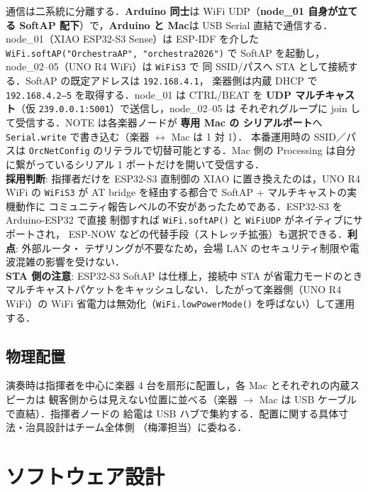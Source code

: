 \documentclass[lualatex,book,paper=a4paper,jafontsize=11.5pt,jafontscale=1.05]{jlreq}
\begin{document}
通信は二系統に分離する．\textbf{Arduino 同士}は WiFi UDP（\textbf{node\_01 自身が立てる
SoftAP 配下}）で，\textbf{Arduino と Mac}は USB Serial 直結で通信する．
node\_01（XIAO ESP32-S3 Sense）は ESP-IDF を介した \texttt{WiFi.softAP("OrchestraAP",
"orchestra2026")} で SoftAP を起動し，node\_02--05（UNO R4 WiFi）は \texttt{WiFiS3} で
同 SSID/パスへ STA として接続する．SoftAP の既定アドレスは \texttt{192.168.4.1}，
楽器側は内蔵 DHCP で \texttt{192.168.4.2--5} を取得する．node\_01 は CTRL/BEAT を
\textbf{UDP マルチキャスト}（仮 \texttt{239.0.0.1:5001}）で送信し，node\_02--05 は
それぞれグループに join して受信する．NOTE は各楽器ノードが \textbf{専用 Mac の
シリアルポート}へ \texttt{Serial.write} で書き込む（楽器 $\leftrightarrow$ Mac は 1 対 1）．
本番運用時の SSID／パスは \texttt{OrcNetConfig} のリテラルで切替可能とする．Mac 側の
Processing は自分に繋がっているシリアル 1 ポートだけを開いて受信する．\\[2pt]
\textbf{採用判断}: 指揮者だけを ESP32-S3 直制御の XIAO に置き換えたのは，UNO R4 WiFi の
\texttt{WiFiS3} が AT bridge を経由する都合で SoftAP + マルチキャストの実機動作に
コミュニティ報告レベルの不安があったためである．ESP32-S3 を Arduino-ESP32 で直接
制御すれば \texttt{WiFi.softAP()} と \texttt{WiFiUDP} がネイティブにサポートされ，
ESP-NOW などの代替手段（ストレッチ拡張）も選択できる．\textbf{利点}: 外部ルータ・
テザリングが不要なため，会場 LAN のセキュリティ制限や電波混雑の影響を受けない．\\[2pt]
\textbf{STA 側の注意}: ESP32-S3 SoftAP は仕様上，接続中 STA が省電力モードのとき
マルチキャストパケットをキャッシュしない．したがって楽器側（UNO R4 WiFi）の
WiFi 省電力は無効化（\texttt{WiFi.lowPowerMode()} を呼ばない）して運用する．

\subsection{物理配置}

演奏時は指揮者を中心に楽器 4 台を扇形に配置し，各 Mac とそれぞれの内蔵スピーカは
観客側からは見えない位置に並べる（楽器 $\to$ Mac は USB ケーブルで直結）．指揮者ノードの
給電は USB ハブで集約する．配置に関する具体寸法・治具設計はチーム全体側
（梅澤担当）に委ねる．


\section{ソフトウェア設計}\label{sec:sw-design}
\end{document}

